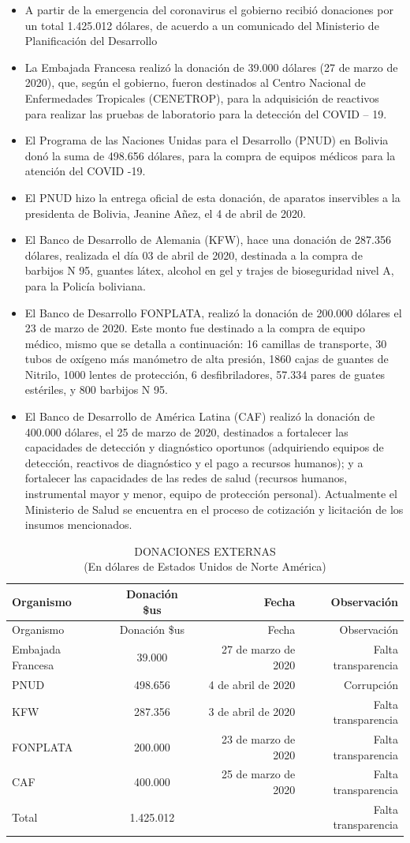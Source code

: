 \documentclass[a4paper, nobind]{templates/ociamthesis}
\begin{document}
\begin{itemize}
\item
  A partir de la emergencia del coronavirus el gobierno recibió donaciones por un total 1.425.012 dólares, de acuerdo a un comunicado del Ministerio de Planificación del Desarrollo
\item
  La Embajada Francesa realizó la donación de 39.000 dólares (27 de marzo de 2020), que, según el gobierno, fueron destinados al Centro Nacional de Enfermedades Tropicales (CENETROP), para la adquisición de reactivos para realizar las pruebas de laboratorio para la detección del COVID -- 19.
\item
  El Programa de las Naciones Unidas para el Desarrollo (PNUD) en Bolivia donó la suma de 498.656 dólares, para la compra de equipos médicos para la atención del COVID -19.
\item
  El PNUD hizo la entrega oficial de esta donación, de aparatos inservibles a la presidenta de Bolivia, Jeanine Añez, el 4 de abril de 2020.
\item
  El Banco de Desarrollo de Alemania (KFW), hace una donación de 287.356 dólares, realizada el día 03 de abril de 2020, destinada a la compra de barbijos N 95, guantes látex, alcohol en gel y trajes de bioseguridad nivel A, para la Policía boliviana.
\item
  El Banco de Desarrollo FONPLATA, realizó la donación de 200.000 dólares el 23 de marzo de 2020. Este monto fue destinado a la compra de equipo médico, mismo que se detalla a continuación: 16 camillas de transporte, 30 tubos de oxígeno más manómetro de alta presión, 1860 cajas de guantes de Nitrilo, 1000 lentes de protección, 6 desfibriladores, 57.334 pares de guates estériles, y 800 barbijos N 95.
\item
  El Banco de Desarrollo de América Latina (CAF) realizó la donación de 400.000 dólares, el 25 de marzo de 2020, destinados a fortalecer las capacidades de detección y diagnóstico oportunos (adquiriendo equipos de detección, reactivos de diagnóstico y el pago a recursos humanos); y a fortalecer las capacidades de las redes de salud (recursos humanos, instrumental mayor y menor, equipo de protección personal). Actualmente el Ministerio de Salud se encuentra en el proceso de cotización y licitación de los insumos mencionados.
\end{itemize}

\begin{longtable}[]{@{}lcrr@{}}
\caption{DONACIONES EXTERNAS\\
(En dólares de Estados Unidos de Norte América)}\tabularnewline
\toprule
Organismo & Donación \$us & Fecha & Observación\tabularnewline
\midrule
\endfirsthead
\toprule
Organismo & Donación \$us & Fecha & Observación\tabularnewline
\midrule
\endhead
Embajada Francesa & 39.000 & 27 de marzo de 2020 & Falta transparencia\tabularnewline
PNUD & 498.656 & 4 de abril de 2020 & Corrupción\tabularnewline
KFW & 287.356 & 3 de abril de 2020 & Falta transparencia\tabularnewline
FONPLATA & 200.000 & 23 de marzo de 2020 & Falta transparencia\tabularnewline
CAF & 400.000 & 25 de marzo de 2020 & Falta transparencia\tabularnewline
Total & 1.425.012 & & Falta transparencia\tabularnewline
\bottomrule
\end{longtable}
\end{document}
